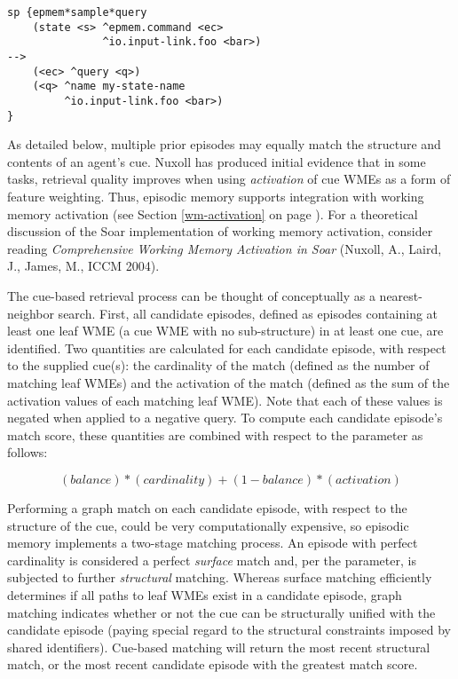 \begin{verbatim}
sp {epmem*sample*query
    (state <s> ^epmem.command <ec>
               ^io.input-link.foo <bar>)
-->
    (<ec> ^query <q>)
    (<q> ^name my-state-name
         ^io.input-link.foo <bar>)
}
\end{verbatim}

As detailed below, multiple prior episodes may equally match the structure and contents of an agent's cue.
Nuxoll has produced initial evidence that in some tasks, retrieval quality improves when using \emph{activation} of cue WMEs as a form of feature weighting.
Thus, episodic memory supports integration with working memory activation (see Section \ref{wm-activation} on page \pageref{wm-activation}).
For a theoretical discussion of the Soar implementation of working memory activation, consider reading \emph{Comprehensive Working Memory Activation in Soar} (Nuxoll, A., Laird, J., James, M., ICCM 2004).

The cue-based retrieval process can be thought of conceptually as a nearest-neighbor search.
First, all candidate episodes, defined as episodes containing at least one leaf WME (a cue WME with no sub-structure) in at least one cue, are identified.
Two quantities are calculated for each candidate episode, with respect to the supplied cue(s): the cardinality of the match (defined as the number of matching leaf WMEs) and the activation of the match (defined as the sum of the activation values of each matching leaf WME).
Note that each of these values is negated when applied to a negative query.
To compute each candidate episode's match score, these quantities are combined with respect to the  parameter as follows:

$$(balance)*(cardinality) + (1-balance)*(activation)$$

Performing a graph match on each candidate episode, with respect to the structure of the cue, could be very computationally expensive, so episodic memory implements a two-stage matching process.
An episode with perfect cardinality is considered a perfect \emph{surface} match and, per the  parameter, is subjected to further \emph{structural} matching.
Whereas surface matching efficiently determines if all paths to leaf WMEs exist in a candidate episode, graph matching indicates whether or not the cue can be structurally unified with the candidate episode (paying special regard to the structural constraints imposed by shared identifiers).
Cue-based matching will return the most recent structural match, or the most recent candidate episode with the greatest match score.

